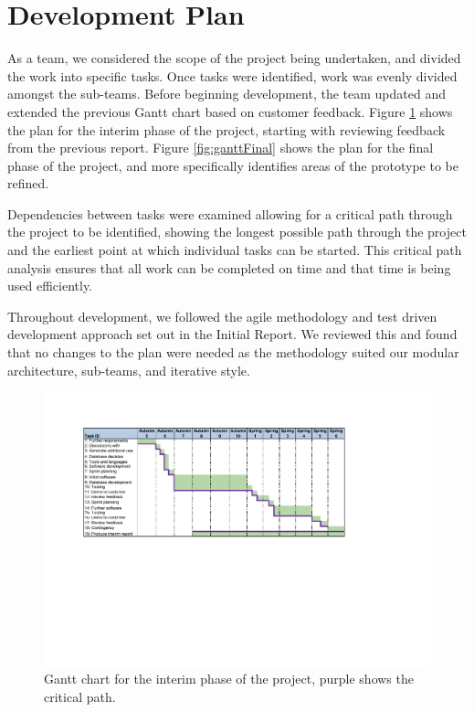\section{Development Plan}
\label{sec:developmentplan}

As a team, we considered the scope of the project being undertaken, and 
divided the work into specific tasks. Once tasks were identified, work was 
evenly divided amongst the sub-teams.
Before beginning development, the team updated and extended 
the previous Gantt chart based on customer feedback.
Figure \ref{fig:ganttInterim}  shows the plan for the interim phase of the project, starting with reviewing feedback from the previous report.
Figure \ref{fig:ganttFinal}  shows the plan for the final phase of the project, and more specifically identifies areas of the prototype to be refined.

Dependencies between tasks were examined allowing for a critical path 
through the project to be identified, showing the longest possible path through the project and the earliest point at which individual tasks can be started. This critical path analysis ensures that all work can be completed on time and that time is being used efficiently. 

Throughout development, we followed the agile methodology and test driven development approach set out in the Initial Report. We reviewed this and found that no changes to the plan were needed as the methodology suited our modular architecture, sub-teams, and iterative style.

\begin{figure}[H]
  \centering
  \includegraphics[width= 15cm]{images/GantInterim.pdf}
  \caption{Gantt chart for the interim phase of the project, purple shows the critical path.}
  \label{fig:ganttInterim}
\end{figure}

